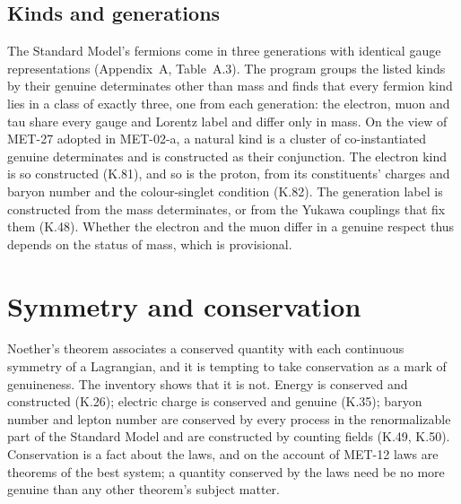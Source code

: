 \documentclass{situationist-preprint}
\begin{document}
\subsection{Kinds and generations}

The Standard Model's fermions come in three generations with identical gauge representations (Appendix~A, Table~A.3). The program groups the \vvNKinds{} listed kinds by their genuine determinates other than mass and finds that every fermion kind lies in a class of exactly three, one from each generation: the electron, muon and tau share every gauge and Lorentz label and differ only in mass. On the view of MET-27 adopted in MET-02-a, a natural kind is a cluster of co-instantiated genuine determinates and is constructed as their conjunction. The electron kind is so constructed (K.81), and so is the proton, from its constituents' charges and baryon number and the colour-singlet condition (K.82). The generation label is constructed from the mass determinates, or from the Yukawa couplings that fix them (K.48). Whether the electron and the muon differ in a genuine respect thus depends on the status of mass, which is provisional.

\section{Symmetry and conservation}\label{s:conservation}

Noether's theorem associates a conserved quantity with each continuous symmetry of a Lagrangian, and it is tempting to take conservation as a mark of genuineness. The inventory shows that it is not. Energy is conserved and constructed (K.26); electric charge is conserved and genuine (K.35); baryon number and lepton number are conserved by every process in the renormalizable part of the Standard Model and are constructed by counting fields (K.49, K.50). Conservation is a fact about the laws, and on the account of MET-12 laws are theorems of the best system; a quantity conserved by the laws need be no more genuine than any other theorem's subject matter.
\end{document}
